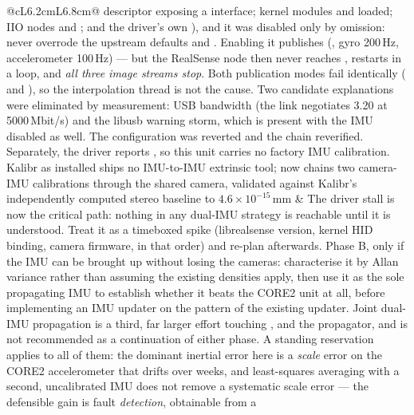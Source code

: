 \begin{longtable}{@{}cL{6.2cm}L{6.8cm}@{}}
    descriptor exposing a  interface; kernel modules
     and  loaded;
    IIO nodes  and ; and the driver's own
    ), and it was disabled only by omission:
     never overrode the upstream defaults
     and . Enabling it
    publishes  (, gyro 200\,Hz,
    accelerometer 100\,Hz) --- but the RealSense node then never reaches
    , restarts in a loop, and \emph{all three
    image streams stop}. Both publication modes fail identically
    ( and ), so the interpolation
    thread is not the cause. Two candidate explanations were eliminated by
    measurement: USB bandwidth (the link negotiates 3.20 at
    5000\,Mbit/s) and the libusb  warning storm,
    which is present with the IMU disabled as well. The configuration was
    reverted and the chain reverified. Separately, the driver reports
    , so this unit carries no
    factory IMU calibration. Kalibr as installed ships no IMU-to-IMU
    extrinsic tool;  now chains two
    camera-IMU calibrations through the shared camera, validated against
    Kalibr's independently computed stereo baseline to
    $4.6\times10^{-15}$\,mm &
    The driver stall is now the critical path: nothing in any dual-IMU
    strategy is reachable until it is understood. Treat it as a timeboxed
    spike (librealsense version, kernel HID binding, camera firmware, in
    that order) and re-plan afterwards. Phase B, only if the IMU can be
    brought up without losing the cameras: characterise it by Allan
    variance rather than assuming the existing densities apply, then use it
    as the sole propagating IMU to establish whether it beats the CORE2
    unit at all, before implementing an IMU updater on the pattern of the
    existing  updater. Joint dual-IMU propagation is a third,
    far larger effort touching ,  and the
    propagator, and is not recommended as a continuation of either phase.
    A standing reservation applies to all of them: the dominant inertial
    error here is a \emph{scale} error on the CORE2 accelerometer that
    drifts over weeks, and least-squares averaging with a second,
    uncalibrated IMU does not remove a systematic scale error --- the
    defensible gain is fault \emph{detection}, obtainable from a

\end{longtable}
